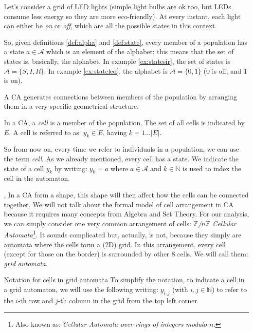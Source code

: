 \begin{example}
\label{ex:stateled}
Let's consider a grid of LED lights (simple light bulbs are ok too, but LEDs
consume less energy so they are more eco-friendly). At every instant, each light can either be 
\textit{on} or \textit{off},
which are all the possible states in this context.
\end{example}

So, given definitions \ref{def:alpha} and \ref{def:state}, every member of a population has a state
$a \in \mathcal{A}$ which is an element of the alphabet; this means that the set of states
is, basically, the alphabet.
In example \ref{ex:statesir}, the set of states is $\mathcal{A} = \{ S, I, R \}$. In example
\ref{ex:stateled}, the alphabet is $\mathcal{A} = \{ 0, 1 \}$ ($0$ is off, and $1$ is on).

A CA generates connections between members of the population by arranging them in a very specific
geometrical structure.

\begin{definition}[Cell]
\label{def:cell}
In a CA, a \textit{cell} is a member of the population. The set of all cells is indicated by $E$. A cell
is referred to as: $y_k \in E$, having $k = 1 \dots |E|$.
\end{definition}

So from now on, every time we refer to individuals in a population, we can use the term \textit{cell}.
As we already mentioned, every cell has a state. We indicate the state of a cell
$y_k$ by writing: $y_k = a$ where $a \in \mathcal{A}$ and $k \in \mathbb{N}$ is used to index the
cell in the automaton.

, In a CA form a shape, this shape will then affect how the cells can be connected together.
We will not talk about the formal model of cell arrangement in CA because it requires many concepts from
Algebra and Set Theory. For our analysis, we can simply consider one very common arrangement of cells:
\textit{$\mathbb{Z}$/$n\mathbb{Z}$ Cellular Automata}\footnote{Also known as: 
\textit{Cellular Automata over rings of integers modulo $n$}.}. It sounds complicated but, actually,
is not, because they simply are automata where the cells form a (2D) grid. In this arrangement, every cell 
(except for those on the border) is surrounded by other 8 cells. We will call them: \textit{grid automata}.

\begin{important}{Notation for cells in grid automata}
To simplify the notation, to indicate a cell in a grid automaton, 
we will use the following writing: $y_{i,j}$ (with
$i,j \in \mathbb{N}$) to refer to the $i$-th row and $j$-th column in the grid from the top left corner.
\end{important}

